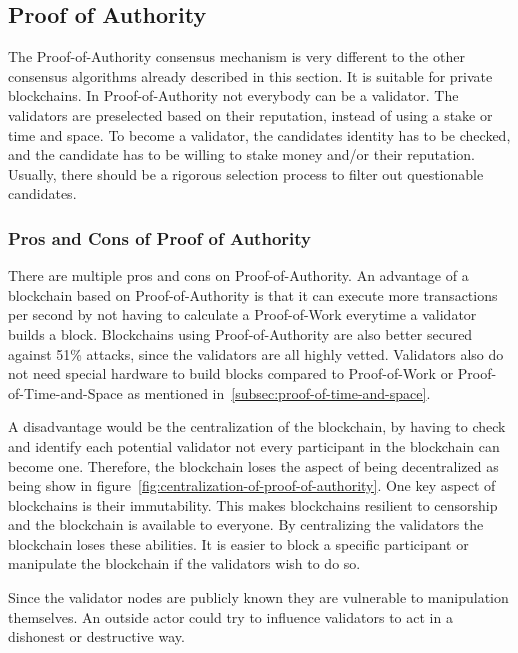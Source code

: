 \subsection{Proof of Authority}\label{subsec:proof-of-authority}
The Proof-of-Authority consensus mechanism is very different to the other consensus algorithms already described in this section.
It is suitable for private blockchains.
In Proof-of-Authority not everybody can be a validator.
The validators are preselected based on their reputation, instead of using a stake or time and space.
To become a validator, the candidates identity has to be checked, and the candidate has to be willing to stake money and/or their reputation.
Usually, there should be a rigorous selection process to filter out questionable candidates.\cite{coindesk-poa}

\subsubsection{Pros and Cons of Proof of Authority}
There are multiple pros and cons on Proof-of-Authority.
An advantage of a blockchain based on Proof-of-Authority is that it can execute more transactions per second by not having to calculate a Proof-of-Work everytime a validator builds a block.
Blockchains using Proof-of-Authority are also better secured against 51\% attacks, since the validators are all highly vetted.
Validators also do not need special hardware to build blocks compared to Proof-of-Work or Proof-of-Time-and-Space as mentioned in\ \ref{subsec:proof-of-time-and-space}.

A disadvantage would be the centralization of the blockchain, by having to check and identify each potential validator not every participant in the blockchain can become one.
Therefore, the blockchain loses the aspect of being decentralized as being show in figure\ \ref{fig:centralization-of-proof-of-authority}.
One key aspect of blockchains is their immutability.
This makes blockchains resilient to censorship and the blockchain is available to everyone.
By centralizing the validators the blockchain loses these abilities.
It is easier to block a specific participant  or manipulate the blockchain if the validators wish to do so.

Since the validator nodes are publicly known they are vulnerable to manipulation themselves.
An outside actor could try to influence validators to act in a dishonest or destructive way.\cite{insidecrypto-poa,coindesk-poa}

